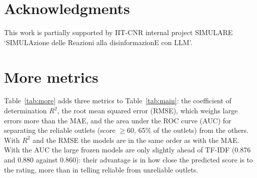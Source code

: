 \documentclass[11pt,a4paper]{article}
\begin{document}
\section*{Acknowledgments}
This work is partially supported by IIT-CNR internal project SIMULARE `SIMULAzione delle Reazioni alla
disinformazionE con LLM'.

\appendix

\section{More metrics}\label{app:measures}
Table~\ref{tab:more} adds three metrics to Table~\ref{tab:main}: the coefficient of determination $R^2$, the root mean
squared error (RMSE), which weighs large errors more than the MAE, and the area under the ROC curve (AUC) for separating
the reliable outlets (score $\geq 60$, 65\% of the outlets) from the others. With $R^2$ and the RMSE the models are in
the same order as with the MAE. With the AUC the large frozen models are only slightly ahead of TF-IDF (0.876 and 0.880
against 0.860): their advantage is in how close the predicted score is to the rating, more than in telling reliable from
unreliable outlets.
\end{document}
